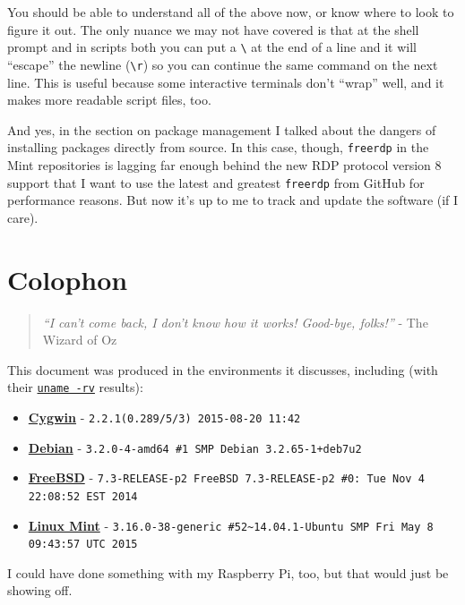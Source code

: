 \documentclass[10pt,]{book}
\renewcommand{\chaptername}{Step}
\numberwithin{figure}{chapter}
\begin{document}
You should be able to understand all of the above now, or know where to
look to figure it out. The only nuance we may not have covered is that
at the shell prompt and in scripts both you can put a
\texttt{\textbackslash{}} at the end of a line and it will ``escape''
the newline (\texttt{\textbackslash{}r}) so you can continue the same
command on the next line. This is useful because some interactive
terminals don't ``wrap'' well, and it makes more readable script files,
too.

And yes, in the section on package management I talked about the dangers
of installing packages directly from source. In this case, though,
\texttt{freerdp} in the Mint repositories is lagging far enough behind
the new RDP protocol version 8 support that I want to use the latest and
greatest \texttt{freerdp} from GitHub for performance reasons. But now
it's up to me to track and update the software (if I care).

\renewcommand{\chaptername}{}
\renewcommand{\thechapter}{}

\chapter{Colophon}\label{colophon}

\begin{quote}
\emph{``I can't come back, I don't know how it works! Good-bye,
folks!''} - The Wizard of Oz
\end{quote}

This document was produced in the environments it discusses, including
(with their \href{http://linux.die.net/man/1/uname}{\texttt{uname -rv}}
results):

\begin{itemize}
\item
  \href{https://cygwin.com/}{\textbf{Cygwin}} -
  \texttt{2.2.1(0.289/5/3) 2015-08-20 11:42}
\item
  \href{http://www.debian.org/}{\textbf{Debian}} -
  \texttt{3.2.0-4-amd64 \#1 SMP Debian 3.2.65-1+deb7u2}
\item
  \href{http://www.freebsd.org/}{\textbf{FreeBSD}} -
  \texttt{7.3-RELEASE-p2 FreeBSD 7.3-RELEASE-p2 \#0: Tue Nov  4 22:08:52 EST 2014}
\item
  \href{http://linuxmint.com/}{\textbf{Linux Mint}} -
  \texttt{3.16.0-38-generic \#52\textasciitilde{}14.04.1-Ubuntu SMP Fri May 8 09:43:57 UTC 2015}
\end{itemize}

I could have done something with my Raspberry Pi, too, but that would
just be showing off.
\end{document}
